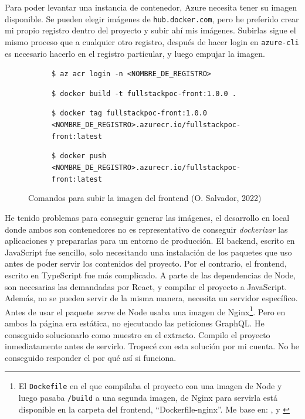 \documentclass[11pt]{article}
\begin{document}
\begin{flushleft}
	Para poder levantar una instancia de contenedor, Azure necesita tener su imagen disponible. Se pueden elegir imágenes de \texttt{hub.docker.com}, pero he preferido crear mi propio registro dentro del proyecto y subir ahí mis imágenes. Subirlas sigue el mismo proceso que a cualquier otro registro, después de hacer login en \texttt{azure-cli} es necesario hacerlo en el registro particular, y luego empujar la imagen.
	\linebreak
	
	\begin{figure}[htb]
		\centering
		\begin{subfigure}{.9\linewidth}
		\scriptsize
		\texttt{\$ az acr login -n <NOMBRE\_DE\_REGISTRO>} 
				
		\texttt{\$ docker build -t fullstackpoc-front:1.0.0 .}
		
		\texttt{\$ docker tag fullstackpoc-front:1.0.0 <NOMBRE\_DE\_REGISTRO>.azurecr.io/fullstackpoc-front:latest} 
		
		\texttt{\$ docker push <NOMBRE\_DE\_REGISTRO>.azurecr.io/fullstackpoc-front:latest} 
		\end{subfigure}
		
		\caption{Comandos para subir la imagen del frontend (O. Salvador, 2022)}
        \label{comandos_docker}
	\end{figure}

	He tenido problemas para conseguir generar las imágenes, el desarrollo en local donde ambos son contenedores no es representativo de conseguir \textit{dockerizar} las aplicaciones y prepararlas para un entorno de producción. El backend, escrito en JavaScript fue sencillo, solo necesitando una instalación de los paquetes que uso antes de poder servir los contenidos del proyecto. Por el contrario, el frontend, escrito en TypeScript fue más complicado. A parte de las dependencias de Node, son necesarias las demandadas por React, y compilar el proyecto a JavaScript. Además, no se pueden servir de la misma manera, necesita un servidor específico. Antes de usar el paquete \textit{serve} de Node usaba una imagen de Nginx\footnote{El \texttt{Dockefile} en el que compilaba el proyecto con una imagen de Node y luego pasaba \texttt{/build} a una segunda imagen, de Nginx para servirla está disponible en la carpeta del frontend, ``Dockerfile-nginx''. Me base en: \cite{docker_nginx1}, \cite{docker_nginxi2} y \cite{docker_nginx3}}. Pero en ambos la página era estática, no ejecutando las peticiones GraphQL. He conseguido solucionarlo como muestro en el extracto. Compilo el proyecto inmediatamente antes de servirlo. Tropecé con esta solución por mi cuenta. No he conseguido responder el por qué así si funciona.
	\linebreak
	

\end{flushleft}
\end{document}
